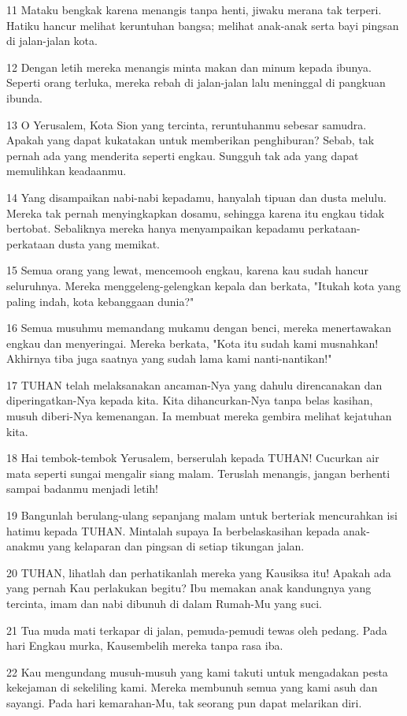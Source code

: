 \par 11 Mataku bengkak karena menangis tanpa henti, jiwaku merana tak terperi. Hatiku hancur melihat keruntuhan bangsa; melihat anak-anak serta bayi pingsan di jalan-jalan kota.
\par 12 Dengan letih mereka menangis minta makan dan minum kepada ibunya. Seperti orang terluka, mereka rebah di jalan-jalan lalu meninggal di pangkuan ibunda.
\par 13 O Yerusalem, Kota Sion yang tercinta, reruntuhanmu sebesar samudra. Apakah yang dapat kukatakan untuk memberikan penghiburan? Sebab, tak pernah ada yang menderita seperti engkau. Sungguh tak ada yang dapat memulihkan keadaanmu.
\par 14 Yang disampaikan nabi-nabi kepadamu, hanyalah tipuan dan dusta melulu. Mereka tak pernah menyingkapkan dosamu, sehingga karena itu engkau tidak bertobat. Sebaliknya mereka hanya menyampaikan kepadamu perkataan-perkataan dusta yang memikat.
\par 15 Semua orang yang lewat, mencemooh engkau, karena kau sudah hancur seluruhnya. Mereka menggeleng-gelengkan kepala dan berkata, "Itukah kota yang paling indah, kota kebanggaan dunia?"
\par 16 Semua musuhmu memandang mukamu dengan benci, mereka menertawakan engkau dan menyeringai. Mereka berkata, "Kota itu sudah kami musnahkan! Akhirnya tiba juga saatnya yang sudah lama kami nanti-nantikan!"
\par 17 TUHAN telah melaksanakan ancaman-Nya yang dahulu direncanakan dan diperingatkan-Nya kepada kita. Kita dihancurkan-Nya tanpa belas kasihan, musuh diberi-Nya kemenangan. Ia membuat mereka gembira melihat kejatuhan kita.
\par 18 Hai tembok-tembok Yerusalem, berserulah kepada TUHAN! Cucurkan air mata seperti sungai mengalir siang malam. Teruslah menangis, jangan berhenti sampai badanmu menjadi letih!
\par 19 Bangunlah berulang-ulang sepanjang malam untuk berteriak mencurahkan isi hatimu kepada TUHAN. Mintalah supaya Ia berbelaskasihan kepada anak-anakmu yang kelaparan dan pingsan di setiap tikungan jalan.
\par 20 TUHAN, lihatlah dan perhatikanlah mereka yang Kausiksa itu! Apakah ada yang pernah Kau perlakukan begitu? Ibu memakan anak kandungnya yang tercinta, imam dan nabi dibunuh di dalam Rumah-Mu yang suci.
\par 21 Tua muda mati terkapar di jalan, pemuda-pemudi tewas oleh pedang. Pada hari Engkau murka, Kausembelih mereka tanpa rasa iba.
\par 22 Kau mengundang musuh-musuh yang kami takuti untuk mengadakan pesta kekejaman di sekeliling kami. Mereka membunuh semua yang kami asuh dan sayangi. Pada hari kemarahan-Mu, tak seorang pun dapat melarikan diri.

